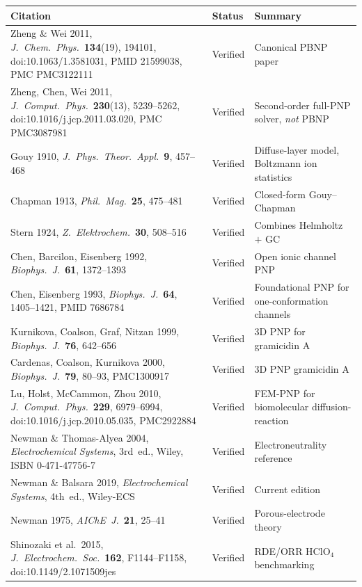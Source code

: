 \documentclass[11pt]{article}
\begin{document}
\begingroup
\small
\setlength{\tabcolsep}{4pt}
\renewcommand{\arraystretch}{1.2}
\begin{longtable}{@{}p{} p{} p{}@{}}
\toprule
\textbf{Citation} & \textbf{Status} & \textbf{Summary} \\
\midrule
\endhead
Zheng \& Wei 2011, \emph{J.~Chem.~Phys.}\ \textbf{134}(19), 194101,
doi:10.1063/1.3581031, PMID 21599038, PMC PMC3122111 &
Verified &
Canonical PBNP paper \\
Zheng, Chen, Wei 2011, \emph{J.~Comput.~Phys.}\ \textbf{230}(13), 5239--5262,
doi:10.1016/j.jcp.2011.03.020, PMC PMC3087981 &
Verified &
Second-order full-PNP solver, \emph{not} PBNP \\
Gouy 1910, \emph{J.~Phys.~Theor.~Appl.}\ \textbf{9}, 457--468 &
Verified &
Diffuse-layer model, Boltzmann ion statistics \\
Chapman 1913, \emph{Phil.~Mag.}\ \textbf{25}, 475--481 &
Verified &
Closed-form Gouy--Chapman \\
Stern 1924, \emph{Z.~Elektrochem.}\ \textbf{30}, 508--516 &
Verified &
Combines Helmholtz $+$ GC \\
Chen, Barcilon, Eisenberg 1992, \emph{Biophys.~J.}\ \textbf{61}, 1372--1393 &
Verified &
Open ionic channel PNP \\
Chen, Eisenberg 1993, \emph{Biophys.~J.}\ \textbf{64}, 1405--1421,
PMID 7686784 &
Verified &
Foundational PNP for one-conformation channels \\
Kurnikova, Coalson, Graf, Nitzan 1999, \emph{Biophys.~J.}\ \textbf{76},
642--656 &
Verified &
3D PNP for gramicidin A \\
Cardenas, Coalson, Kurnikova 2000, \emph{Biophys.~J.}\ \textbf{79}, 80--93,
PMC1300917 &
Verified &
3D PNP gramicidin A \\
Lu, Holst, McCammon, Zhou 2010, \emph{J.~Comput.~Phys.}\ \textbf{229},
6979--6994, doi:10.1016/j.jcp.2010.05.035, PMC2922884 &
Verified &
FEM-PNP for biomolecular diffusion-reaction \\
Newman \& Thomas-Alyea 2004, \emph{Electrochemical Systems}, 3rd~ed., Wiley,
ISBN 0-471-47756-7 &
Verified &
Electroneutrality reference \\
Newman \& Balsara 2019, \emph{Electrochemical Systems}, 4th~ed., Wiley-ECS &
Verified &
Current edition \\
Newman 1975, \emph{AIChE~J.}\ \textbf{21}, 25--41 &
Verified &
Porous-electrode theory \\
Shinozaki et al.\ 2015, \emph{J.~Electrochem.~Soc.}\ \textbf{162}, F1144--F1158,
doi:10.1149/2.1071509jes &
Verified &
RDE/ORR $\mathrm{HClO}_4$ benchmarking \\
\bottomrule
\end{longtable}
\endgroup
\end{document}
